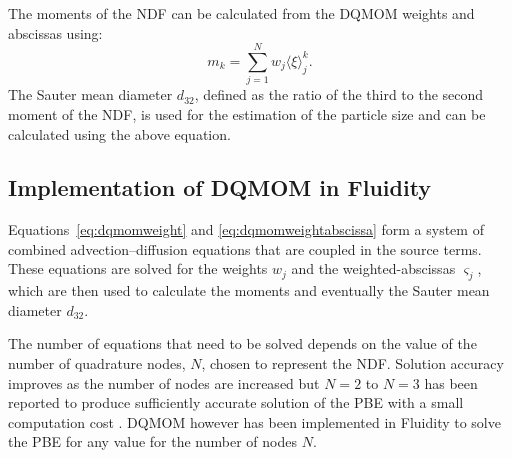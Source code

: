 The moments of the NDF can be calculated from the DQMOM weights and abscissas using:
\begin{equation} \label{eq:moments_quad_wts_abs}
m_k = \sum_{j=1}^N w_{j} \langle \xi \rangle_{j}^k.
\end{equation}
The Sauter mean diameter $d_{32}$, defined as the ratio of the third to the second moment of the NDF, is used for the estimation of the particle size and can be calculated using the above equation.

\subsection{Implementation of DQMOM in Fluidity}
\label{DQMOM_implementation_Fluidity}
Equations~\eqref{eq:dqmomweight} and \eqref{eq:dqmomweightabscissa} form a system of combined advection--diffusion equations that are coupled in the source terms. 
These equations are solved for the weights $w_j$ and the weighted-abscissas $\varsigma_j$, which are then used to calculate the moments and eventually the Sauter mean diameter $d_{32}$.

The number of equations that need to be solved depends on the value of the number of quadrature nodes, $N$, chosen to represent the NDF. Solution accuracy improves as the number of nodes are increased but $N=2$ to $N=3$ has been reported to produce sufficiently accurate solution of the PBE  with a small computation cost \citep{marchisio2005solution}. 
DQMOM however has been implemented in Fluidity to solve the PBE for any value for the number of nodes $N$.

